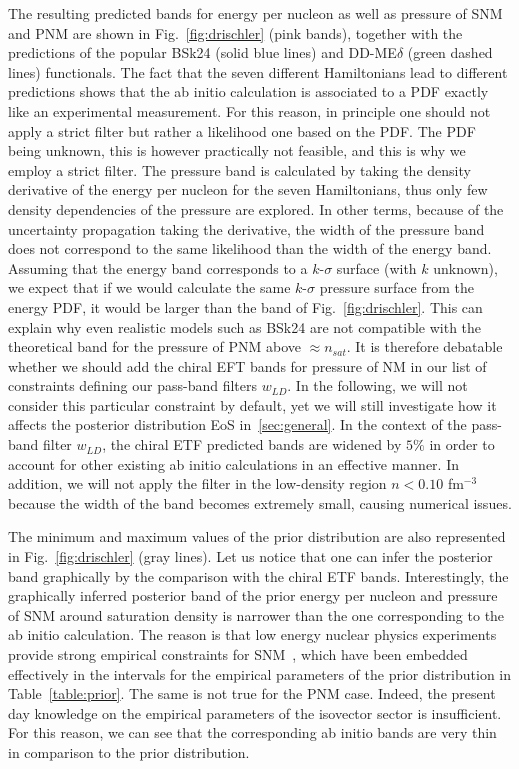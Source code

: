 The resulting predicted bands for energy per nucleon as well as pressure of SNM
and PNM are shown in Fig.~\ref{fig:drischler} (pink bands), together with 
the predictions of the popular BSk24 (solid blue lines) and DD-ME$\delta$ 
(green dashed lines) functionals. 
The fact that the seven different Hamiltonians lead to different predictions
shows that the ab initio calculation is associated to a PDF exactly like an
experimental measurement. For this reason, in principle one should not apply a
strict filter but rather a likelihood one based on the PDF. The PDF being
unknown, this is however practically not feasible, and this is why we employ a
strict filter. 
The pressure band is calculated by taking the density derivative of the energy 
per nucleon for the seven Hamiltonians, thus only few density dependencies of 
the pressure are explored. 
%
In other terms, because of the uncertainty propagation taking the derivative, 
the width of the pressure band does not correspond to the same likelihood than 
the width of the energy band. Assuming that the energy band corresponds to a 
$k$-$\sigma$ surface (with $k$ unknown), we expect that if we would calculate 
the same $k$-$\sigma$ pressure surface from the energy PDF, it would be larger 
than the band of Fig.~\ref{fig:drischler}. 
%
This can explain why even realistic models such as 
BSk24 are not compatible with the theoretical band for the 
pressure of PNM above $\approx n_{sat}$. It is therefore debatable whether 
we should add the chiral EFT bands for pressure of NM in our list of
constraints defining our pass-band filters $w_{LD}$. In the following, we will 
not consider this particular constraint by default, yet we will still 
investigate how it affects the posterior distribution EoS in~\ref{sec:general}.
In the context of the pass-band filter $w_{LD}$, the chiral ETF predicted 
bands are widened by $5\%$ in order to account for other existing ab initio 
calculations in an effective manner. In addition, we will not apply the filter
in the low-density region $n < 0.10$ fm$^{-3}$ because the width of the band 
becomes extremely small, causing numerical issues.

The minimum and maximum values of the prior distribution are also
represented in Fig.~\ref{fig:drischler} (gray lines). Let us notice that one 
can infer the posterior band graphically by the comparison with the chiral 
ETF bands. Interestingly, the graphically inferred posterior band of the 
prior energy per nucleon and pressure of SNM around saturation density is 
narrower than the one corresponding to the ab initio calculation. The reason is
that low energy nuclear physics experiments provide strong empirical
constraints for SNM~\cite{Margueron2018a}, which have been embedded 
effectively in the intervals for the empirical parameters of the prior
distribution in Table~\ref{table:prior}. The same is not true for the PNM case. 
Indeed, the present day knowledge on the empirical parameters of the 
isovector sector is insufficient. For this reason, we can see that the 
corresponding ab initio bands are very thin in comparison to the prior 
distribution.

